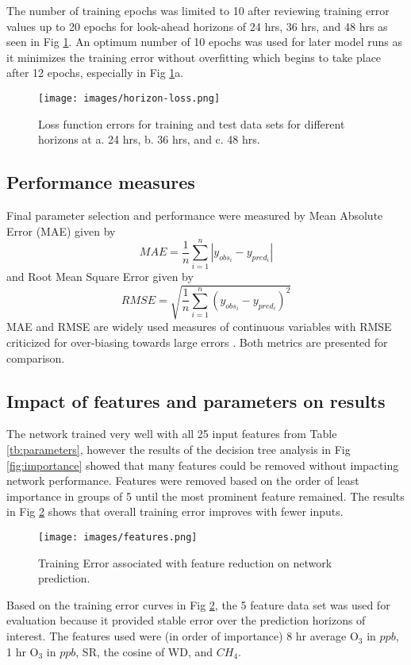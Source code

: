 The number of training epochs was limited to 10 after reviewing training error values up to 20 epochs for look-ahead horizons of 24 hrs, 36 hrs, and 48 hrs as seen in Fig \ref{fig:horizon-loss}. An optimum number of 10 epochs was used for later model runs as it minimizes the training error without overfitting which begins to take place after 12 epochs, especially in Fig \ref{fig:horizon-loss}a. 
%
\begin{figure}[!htb]
\centering
\texttt{[image: images/horizon-loss.png]}  %
\caption[Loss function errors of training and test data sets]{Loss function errors for training and test data sets for different horizons at a. 24 hrs, b. 36 hrs, and c. 48 hrs.}
\label{fig:horizon-loss}
\end{figure}
%

\subsection{Performance measures}

Final parameter selection and performance were measured by Mean Absolute Error (MAE) given by 
%
\begin{equation}
\label{eq:MAE}
MAE = \frac{1}{n}\sum^{n}_{i=1} \left | y_{obs_{i}}- y_{pred_{i}} \right |
\end{equation}
%
and Root Mean Square Error given by
%
\begin{equation}
\label{eq:RMSE}
RMSE = \sqrt{\frac{1}{n}\sum^{n}_{i=1} \left ( y_{obs_{i}}- y_{pred_{i}} \right )^{2}}
\end{equation}
%
MAE and RMSE are widely used measures of continuous variables with RMSE criticized for over-biasing towards large errors \citep{Chai2014, Willmott2005}. Both metrics are presented for comparison.

\subsection{Impact of features and parameters on results}

The network trained very well with all 25 input features from Table \ref{tb:parameters}, however the results of the decision tree analysis in Fig \ref{fig:importance} showed that many features could be removed without impacting network performance. Features were removed based on the order of least importance in groups of 5 until the most prominent feature remained. The results in Fig \ref{fig:features} shows that overall training error improves with fewer inputs.
%
\begin{figure}[!htb]
\centering
\texttt{[image: images/features.png]}  %
\caption{Training Error associated with feature reduction on network prediction.}
\label{fig:features}
\end{figure}
%
Based on the training error curves in Fig \ref{fig:features}, the 5 feature data set was used for evaluation because it provided stable error over the prediction horizons of interest. The features used were (in order of importance) 8 hr average O$_{3}$ in $ppb$, 1 hr O$_{3}$ in $ppb$, SR, the cosine of WD, and $CH_{4}$.

